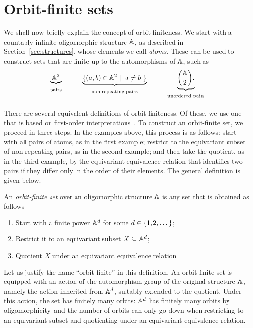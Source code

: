\section{Orbit-finite sets}
\label{sec:orbit-finite-sets}
We shall now briefly explain the concept of orbit-finiteness.
We start with a countably infinite oligomorphic structure $\mathbb{A}$, as described in Section~\ref{sec:structures}, whose elements we call \emph{atoms}. 
These can be used to construct sets that are finite up to the automorphisms of $\mathbb{A}$, such as
\begin{align*}
   \myunderbrace{\A^2}{pairs}
   \qquad
   \myunderbrace{\setbuild{ (a,b) \in \A^2}{ $a \neq b$ }}{non-repeating pairs}
   \qquad
   \myunderbrace{\binom{\A}{2}.}{unordered pairs}
\end{align*}

There are several equivalent definitions of orbit-finiteness. 
Of these, we use one that is based on first-order interpretations~\cite[Sec.~4.3]{hodges1993model}. 
To construct an orbit-finite set, we proceed in three steps. 
In the examples above, this process is as follows:
start with all pairs of atoms, as in the first example; 
restrict to the equivariant subset of non-repeating pairs, as in the second example; 
and then take the quotient, as in the third example, by the equivariant equivalence relation that identifies two pairs if they differ only in the order of their elements.
The general definition is given below.

 \begin{definition}\label{def:orbit-finite-set}
    An \emph{orbit-finite set} over an oligomorphic structure $\mathbb{A}$ is any set that is obtained as follows: 
    \begin{enumerate}
        \item Start with a finite power $\mathbb{A}^d$ for some $d \in \{1,2,\dots\}$;
        \item Restrict it to an equivariant subset $X \subseteq \mathbb{A}^d$;
        \item Quotient $X$ under an equivariant equivalence relation. 
    \end{enumerate}
 \end{definition}

Let us justify the name ``orbit-finite'' in this definition. 
An orbit-finite set is equipped with an action of the automorphism group of the original structure $\mathbb{A}$, namely the action inherited from $\mathbb{A}^d$, suitably extended to the quotient. 
Under this action, the set has finitely many orbits: 
$\mathbb{A}^d$ has finitely many orbits by oligomorphicity, 
and the number of orbits can only go down when restricting to an equivariant subset and quotienting under an equivariant equivalence relation. 
  
